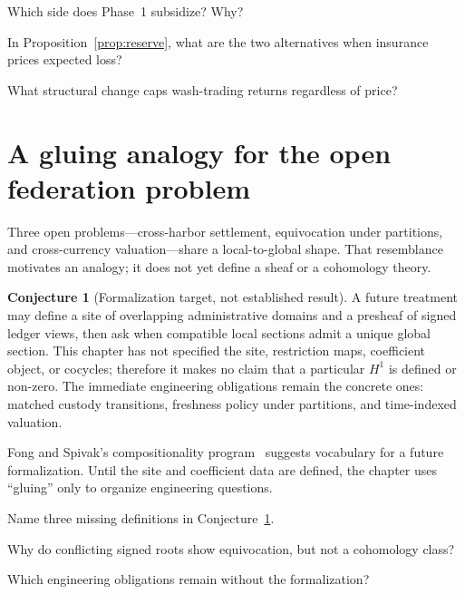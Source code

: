 \documentclass[11pt,a4paper]{article}
\theoremstyle{definition}
\newtheorem{conjecture}{Conjecture}[section]
\theoremstyle{definition}
\theoremstyle{remark}
\begin{document}
\begin{pdrecitation}
\item Which side does Phase~1 subsidize? Why?
\item In Proposition~\ref{prop:reserve}, what are the two alternatives when insurance prices expected loss?
\item What structural change caps wash-trading returns regardless of price?
\end{pdrecitation}

\section{A gluing analogy for the open federation problem}\label{sec:sheaf}

Three open problems---cross-harbor settlement, equivocation under partitions, and
cross-currency valuation---share a local-to-global shape. That resemblance motivates
an analogy; it does not yet define a sheaf or a cohomology theory.

\begin{conjecture}[Formalization target, not established result]\label{conj:sheaf}
A future treatment may define a site of overlapping administrative domains and a
presheaf of signed ledger views, then ask when compatible local sections admit a
unique global section. This chapter has not specified the site, restriction maps,
coefficient object, or cocycles; therefore it makes no claim that a particular
$H^1$ is defined or non-zero. The immediate engineering obligations remain the
concrete ones: matched custody transitions, freshness policy under partitions, and
time-indexed valuation.
\end{conjecture}

Fong and Spivak's compositionality program~ suggests vocabulary for
a future formalization. Until the site and coefficient data are defined, the chapter
uses ``gluing'' only to organize engineering questions.

\pdexercisepointer*{\ref{ex:he-sheaf-site-cover}}{\ref{ex:he-gluing-model-build}}{\pageref{ex:he-sheaf-site-cover}}

\begin{pdrecitation}
\item Name three missing definitions in Conjecture~\ref{conj:sheaf}.
\item Why do conflicting signed roots show equivocation, but not a cohomology class?
\item Which engineering obligations remain without the formalization?
\end{pdrecitation}
\end{document}
